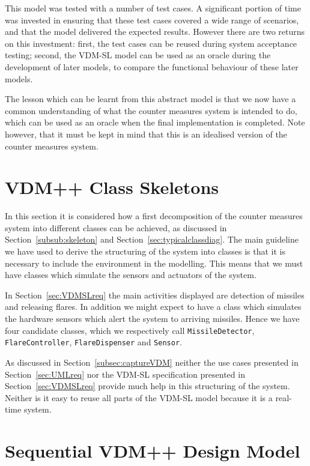 \documentclass{overturerepchap}
\begin{document}
This model was tested with a number of test cases. A significant
portion of time was invested in ensuring that these test cases covered
a wide range of scenarios, and that the model delivered the expected
results. However there are two returns on this investment: first, the
test cases can be reused during system acceptance testing; second, the
VDM-SL model can be used as an oracle during the development of later
models, to compare the functional behaviour of these later models.

The lesson which can be learnt from this abstract model is that we now
have a common understanding of what the counter measures system is
intended to do, which can be used as an oracle when the final
implementation is completed. Note however, that it must be kept in mind
that this is an idealised version of the counter measures system.

\section{VDM++ Class Skeletons}\label{sec:skeleton}

In this section it is considered how a first decomposition of the
counter measures system into different classes can be achieved, as
discussed in Section~\ref{subsub:skeleton} and 
Section~\ref{sec:typicalclassdiag}. The main guideline we have used to
derive the structuring of the system into classes is that it is
necessary to include the environment in the modelling. This means that
we must have classes which simulate the sensors and actuators of the
system.

In Section~\ref{sec:VDMSLreq} the main activities displayed are
detection of missiles and releasing flares.  In addition we might
expect to have a class which simulates the hardware sensors which
alert the system to arriving missiles. Hence we have four candidate
classes, which we respectively call \texttt{MissileDetector},
\texttt{FlareController}, \texttt{FlareDispenser} and \texttt{Sensor}.

As discussed in Section~\ref{subsec:captureVDM} neither the use cases
presented in Section~\ref{sec:UMLreq} nor the VDM-SL specification
presented in Section~\ref{sec:VDMSLreq} provide much help in this
structuring of the system. Neither is it easy to reuse all parts of
the VDM-SL model because it is a real-time system.

\section{Sequential VDM++ Design Model}\label{sec:seqVDM}\label{sec:sequential}
\end{document}

